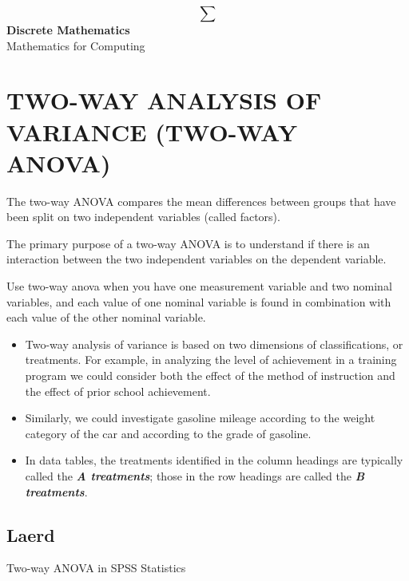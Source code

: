 \documentclass[]{article}
\begin{document}
	
	\large
	\tableofcontents
	\newpage
\newpage

\begin{center}
{\fontsize{2.5cm}{1em}\selectfont \[ \sum \]}
{\fontsize{1.5cm}{1em}\selectfont\textbf{ Discrete Mathematics} }\\ \bigskip
{\fontsize{0.8cm}{1em}\textrm{Mathematics for Computing}}\\
\end{center}
\newpage

\section{TWO-WAY ANALYSIS OF VARIANCE (TWO-WAY ANOVA)}
\begin{framed}
\noindent The two-way ANOVA compares the mean differences between groups that have been split on two independent variables (called factors). 

The primary purpose of a two-way ANOVA is to understand if there is an interaction between the two independent variables on the dependent variable.
\end{framed}


Use two-way anova when you have one measurement variable and two nominal variables, and each value of one nominal variable is found in combination with each value of the other nominal variable.


\begin{itemize}
\item Two-way analysis of variance is based on two dimensions of classifications, or treatments. For example, in
analyzing the level of achievement in a training program we could consider both the effect of the method of
instruction and the effect of prior school achievement. \item Similarly, we could investigate gasoline mileage
according to the weight category of the car and according to the grade of gasoline. 
\item In data tables, the treatments
identified in the column headings are typically called the \textbf{\textit{A treatments}}; those in the row headings are called the \textbf{\textit{B
treatments}}.
\end{itemize}

\subsection{Laerd}
Two-way ANOVA in SPSS Statistics
\end{document}
